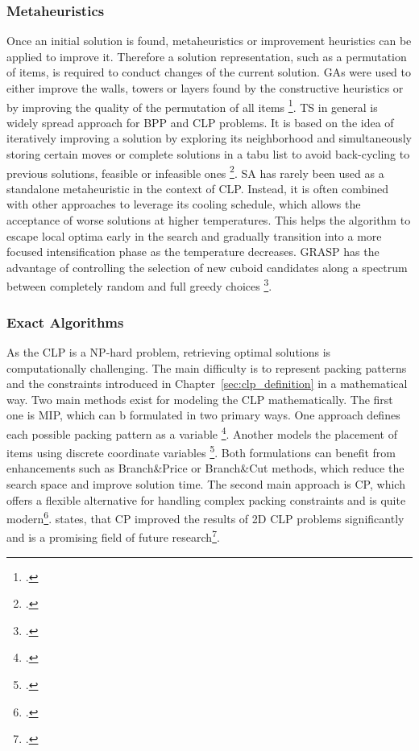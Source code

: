 \subsubsection{Metaheuristics}
Once an initial solution is found, metaheuristics or improvement heuristics can be applied
to improve it. Therefore a solution representation, such as a permutation of items, is required
to conduct changes of the current solution. \gls{GA}s were
used to either improve the walls, towers or layers found by the constructive heuristics
or by improving the quality of the permutation of all items \footcite[cf.][]{gehring_genetic_1997,bortfeldt_hybrid_2001}.
\gls{TS} in general is widely spread approach for \gls{BPP} and \gls{CLP} problems. It is based on
the idea of iteratively improving a solution by exploring its neighborhood and simultaneously
storing certain moves or complete solutions in a tabu list to avoid back-cycling to
previous solutions, feasible or infeasible ones \footcite[cf.][pp. 344--345]{gendreau_tabu_2006}. \gls{SA} has rarely been used as a
standalone metaheuristic in the context of \gls{CLP}. Instead, it is often combined
with other approaches to leverage its cooling schedule, which allows the acceptance of
worse solutions at higher temperatures. This helps the algorithm to escape local optima
early in the search and gradually transition into a more focused intensification phase as
the temperature decreases. \gls{GRASP} has the advantage of controlling the selection of new
cuboid candidates along a spectrum between completely random and full greedy choices \footcite[cf.][]{moura_grasp_2005}.

\subsubsection{Exact Algorithms}
As the \gls{CLP} is a NP-hard problem, retrieving optimal solutions is computationally
challenging. The main difficulty is to represent packing patterns and the constraints
introduced in Chapter~\ref{sec:clp_definition} in a mathematical way. Two main methods
exist for modeling the \gls{CLP} mathematically. The first one is \gls{MIP}, which can b
formulated in two primary ways. One approach defines each possible packing pattern as
a variable \footcite[cf.][pp. 29--30]{zhu_prototype_2012}. Another models
the placement of items using discrete coordinate variables \footcite[cf.][pp. 4--8]{moura_integrated_2009}.
Both formulations can benefit from enhancements such as Branch\&Price or Branch\&Cut
methods, which reduce the search space and improve solution time.
The second main approach is \gls{CP}, which offers a flexible alternative for handling
complex packing constraints and is quite modern\footcites[cf.][pp. 5--8]{kucuk_constraint_2022}[cf.][pp. 7--11]{tamke_branch-and-cut_2024}. \citeauthor*{iori_exact_2021} states, that
\gls{CP} improved the results of 2D \gls{CLP} problems significantly and is a promising
field of future research\footcite[cf.][p. 23]{iori_exact_2021}.

